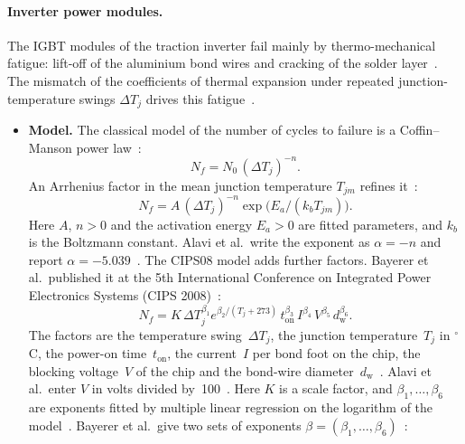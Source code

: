 \documentclass[11pt,a4paper]{article}
\theoremstyle{plain}
\theoremstyle{definition}
\theoremstyle{remark}
\begin{document}
\paragraph{Inverter power modules.}
The IGBT modules of the traction inverter fail mainly by thermo-mechanical fatigue: lift-off of the aluminium bond wires and cracking of the solder layer~\cite[Sec.~1]{Alavi2024}.
The mismatch of the coefficients of thermal expansion under repeated junction-temperature swings $\Delta T_j$ drives this fatigue~\cite[Secs.~1 and~4]{Alavi2024}.
\begin{itemize}
  \item \textbf{Model.}
    The classical model of the number of cycles to failure is a Coffin--Manson power law~\cite[Eq.~3]{Alavi2024}:
    \begin{equation}
      N_f = N_0\,(\Delta T_j)^{-n}.
    \end{equation}
    An Arrhenius factor in the mean junction temperature $T_{jm}$ refines it~\cite[Eq.~4]{Alavi2024}:
    \begin{equation}
      N_f = A\,(\Delta T_j)^{-n}\exp\!\bigl(E_a/(k_b T_{jm})\bigr).
    \end{equation}
    Here $A$, $n > 0$ and the activation energy $E_a > 0$ are fitted parameters, and $k_b$ is the Boltzmann constant.
    Alavi et al.\ write the exponent as $\alpha = -n$ and report $\alpha = -5.039$~\cite[Sec.~4]{Alavi2024}.
    The CIPS08 model adds further factors.
    Bayerer et al.\ published it at the 5th International Conference on Integrated Power Electronics Systems (CIPS 2008)~\cite[Eq.~(1)]{Bayerer2008}:
    \begin{equation}
      N_f = K\,\Delta T_j^{\beta_1} e^{\beta_2/(T_j+273)}\, t_{\mathrm{on}}^{\beta_3}\, I^{\beta_4}\, V^{\beta_5}\, d_{\mathrm{w}}^{\beta_6}.
    \end{equation}
    The factors are the temperature swing~$\Delta T_j$, the junction temperature~$T_j$ in $^\circ$C, the power-on time~$t_{\mathrm{on}}$, the current~$I$ per bond foot on the chip, the blocking voltage~$V$ of the chip and the bond-wire diameter~$d_{\mathrm{w}}$~\cite[Secs.~2.2 and~3.1, Fig.~2]{Bayerer2008}.
    Alavi et al.\ enter $V$ in volts divided by~100~\cite[Sec.~4]{Alavi2024}.
    Here $K$ is a scale factor, and $\beta_1,\dots,\beta_6$ are exponents fitted by multiple linear regression on the logarithm of the model~\cite[Sec.~3.2]{Bayerer2008}.
    Bayerer et al.\ give two sets of exponents $\beta = (\beta_1, \ldots, \beta_6)$~\cite[Eqs.~(5)--(6)]{Bayerer2008}:
    \begin{itemize}

\end{itemize}
\end{itemize}
\end{document}
